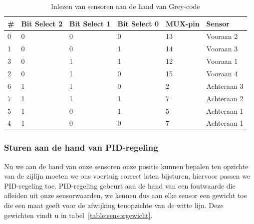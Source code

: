\documentclass[11pt,a4paper]{report}
\begin{document}
\begin{table}[H]
	\centering
	\begin{tabular}{|l|l|l|l|l|l|}
		\hline
		\# & Bit Select 2 & Bit Select 1 & Bit Select 0 & MUX-pin & Sensor      \\ \hline
		0  & 0            & 0            & 0            & 13      & Vooraan 2   \\ \hline
		1  & 0            & 0            & 1            & 14      & Vooraan 3   \\ \hline
		3  & 0            & 1            & 1            & 12      & Vooraan 1   \\ \hline
		2  & 0            & 1            & 0            & 15      & Vooraan 4   \\ \hline
		6  & 1            & 1            & 0            & 2       & Achteraan 3 \\ \hline
		7  & 1            & 1            & 1            & 7       & Achteraan 2 \\ \hline
		5  & 1            & 0            & 1            & 5       & Achteraan 1 \\ \hline
		4  & 1            & 0            & 0            & 7       & Achteraan 1 \\ \hline
	\end{tabular}
	\caption{Inlezen van sensoren aan de hand van Grey-code}
	\label{table:graycode}
\end{table}

\subsubsection*{Sturen aan de hand van PID-regeling}
Nu we aan de hand van onze sensoren onze positie kunnen bepalen ten opzichte van de zijlijn moeten we ons voertuig correct laten bijsturen, hiervoor passen we PID-regeling toe. PID-regeling gebeurt aan de hand van een foutwaarde die afleiden uit onze sensorwaarden, we kennen dus aan elke sensor een gewicht toe die een maat geeft voor de afwijking tenopzichte van de witte lijn. Deze gewichten vindt u in tabel~\vref{table:sensorgewicht}.
\end{document}
